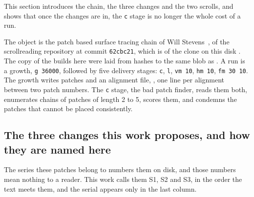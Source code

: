This section introduces the chain, the three changes and the two scrolls, and shows that once the changes are in, the \texttt{c} stage is no longer the whole cost of a run.

The object is the patch based surface tracing chain of Will Stevens~\cite{stevensrepo}, \protect{} of the scrollreading repository at commit \texttt{62cbc21}, which is \protect{} of the clone on this disk {}. The copy of \protect{} the builds here were laid from hashes to the same blob as \protect{}. A run is a growth, \texttt{g 36000}, followed by five delivery stages: \texttt{c}, \texttt{l}, \texttt{vm 10}, \texttt{hm 10}, \texttt{fm 30 10}. The growth writes patches and an alignment file, \protect{}, one line per alignment between two patch numbers. The \texttt{c} stage, the bad patch finder, reads them both, enumerates chains of patches of length 2 to 5, scores them, and condemns the patches that cannot be placed consistently.

\subsection{The three changes this work proposes, and how they are named here}

The series these patches belong to numbers them on disk, and those numbers mean nothing to a reader. This work calls them S1, S2 and S3, in the order the text meets them, and the serial appears only in the last column.

